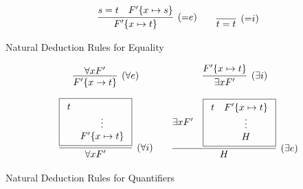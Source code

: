 \begin{definition}
\begin{table}[hbt]
	\begin{gather*}
	\infer[({=}e)]{F'\{x\mapsto t\}}{s=t & F'\{x\mapsto s\}}
	\qquad
	\infer[({=}i)]{t=t}{}
	\end{gather*}
	\caption{Natural Deduction Rules for Equality}
	\label{tab:natural:deduction:equality}
\end{table}

\begin{table}[hbt]
	\begin{gather*}
	\begin{array}{ccc}
	\infer[(\forall e)]{F'\{x\to t\}}{
		\forall x F'
	}
	&&
		\infer[(\exists i)]{\exists x F'}{
		F'\{x\mapsto t \}
	}
	\\[1em]
	\infer[(\forall i)]{\forall x F'}{
		\boxed{\begin{array}{cc}t\\&\vdots\\&F'\{x\mapsto t\}\end{array}}
	}
	&&
	\infer[(\exists e)]{H}{
		\exists x F' &
		\boxed{\begin{array}{cc}t&F'\{x\mapsto t \}\\&\vdots\\&H\end{array}}
	}
	\end{array}
	\end{gather*}
	\caption{Natural Deduction Rules for Quantifiers}
	\label{tab:natural:deduction:quantifiers}
\end{table}
\end{definition}